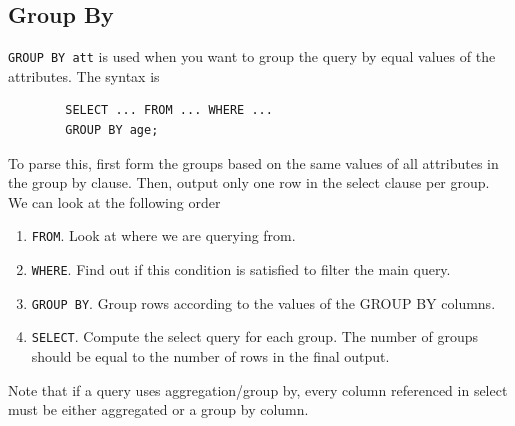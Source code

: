 \documentclass{article}
\begin{document}
  \subsection{Group By} 

    \begin{definition}
      \texttt{GROUP BY att} is used when you want to group the query by equal values of the attributes. The syntax is 
      \begin{lstlisting}
        SELECT ... FROM ... WHERE ... 
        GROUP BY age; 
      \end{lstlisting}
      To parse this, first form the groups based on the same values of all attributes in the group by clause. Then, output only one row in the select clause per group. We can look at the following order
      \begin{enumerate}
        \item \texttt{FROM}. Look at where we are querying from. 
        \item \texttt{WHERE}. Find out if this condition is satisfied to filter the main query. 
        \item \texttt{GROUP BY}. Group rows according to the values of the GROUP BY columns. 
        \item \texttt{SELECT}. Compute the select query for each group. The number of groups should be equal to the number of rows in the final output. 
      \end{enumerate}
      Note that if a query uses aggregation/group by, every column referenced in select must be either aggregated or a group by column. 
    \end{definition}
\end{document}
